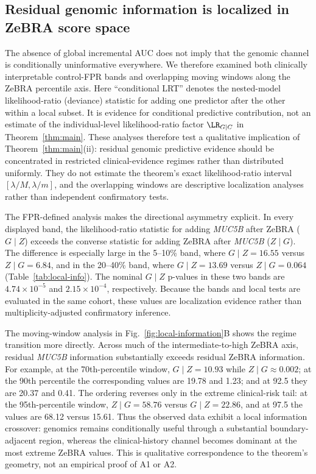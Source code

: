 {\figMUCfiveBApparentAndStratified

\subsection{Residual genomic information is localized in ZeBRA score space}
The absence of global incremental AUC does not imply that the genomic channel is conditionally uninformative everywhere. We therefore examined both clinically interpretable control-FPR bands and overlapping moving windows along the ZeBRA percentile axis. Here ``conditional LRT'' denotes the nested-model likelihood-ratio (deviance) statistic for adding one predictor after the other within a local subset. It is evidence for conditional predictive contribution, not an estimate of the individual-level likelihood-ratio factor $\LR_{G\mid C}$ in Theorem~\ref{thm:main}. These analyses therefore test a qualitative implication of Theorem~\ref{thm:main}(ii): residual genomic predictive evidence should be concentrated in restricted clinical-evidence regimes rather than distributed uniformly. They do not estimate the theorem's exact likelihood-ratio interval $[\lambda/M,\lambda/m]$, and the overlapping windows are descriptive localization analyses rather than independent confirmatory tests.

The FPR-defined analysis makes the directional asymmetry explicit. In every displayed band, the likelihood-ratio statistic for adding \textit{MUC5B} after ZeBRA ($G\mid Z$) exceeds the converse statistic for adding ZeBRA after \textit{MUC5B} ($Z\mid G$). The difference is especially large in the 5--10\% band, where $G\mid Z=16.55$ versus $Z\mid G=6.84$, and in the 20--40\% band, where $G\mid Z=13.69$ versus $Z\mid G=0.064$ (Table~\ref{tab:local-info}). The nominal $G\mid Z$ p-values in these two bands are $4.74\times10^{-5}$ and $2.15\times10^{-4}$, respectively. Because the bands and local tests are evaluated in the same cohort, these values are localization evidence rather than multiplicity-adjusted confirmatory inference.

The moving-window analysis in Fig.~\ref{fig:local-information}B shows the regime transition more directly. Across much of the intermediate-to-high ZeBRA axis, residual \textit{MUC5B} information substantially exceeds residual ZeBRA information. For example, at the 70th-percentile window, $G\mid Z=10.93$ while $Z\mid G\approx0.002$; at the 90th percentile the corresponding values are 19.78 and 1.23; and at 92.5 they are 20.37 and 0.41. The ordering reverses only in the extreme clinical-risk tail: at the 95th-percentile window, $Z\mid G=58.76$ versus $G\mid Z=22.86$, and at 97.5 the values are 68.12 versus 15.61. Thus the observed data exhibit a local information crossover: genomics remains conditionally useful through a substantial boundary-adjacent region, whereas the clinical-history channel becomes dominant at the most extreme ZeBRA values. This is qualitative correspondence to the theorem's geometry, not an empirical proof of A1 or A2.

}
